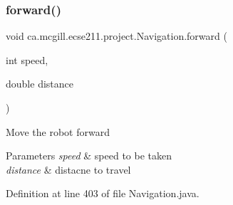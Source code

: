 \subsubsection{\texorpdfstring{forward()}{forward()}}
{\footnotesize\ttfamily void ca.\+mcgill.\+ecse211.\+project.\+Navigation.\+forward (\begin{DoxyParamCaption}\item[{int}]{speed,  }\item[{double}]{distance }\end{DoxyParamCaption})}

Move the robot forward


\begin{DoxyParams}{Parameters}
{\em speed} & speed to be taken \\
\hline
{\em distance} & distacne to travel \\
\hline
\end{DoxyParams}


Definition at line 403 of file Navigation.\+java.


